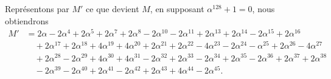 \documentclass[12pt,a4paper]{article}
\theoremstyle{definition}
\begin{document}
Repr\'{e}sentons par $M'$ ce que devient $M$, en supposant $\alpha^{128} + 1 = 0$, nous obtiendrons
\begin{align*}
M' &= 2\alpha - 2\alpha^4 + 2\alpha^5 + 2\alpha^7 + 2\alpha^8 - 2\alpha^{10} - 2\alpha^{11} + 2\alpha^{13} + 2\alpha^{14} - 2\alpha^{15} + 2\alpha^{16} \\
&\quad + 2\alpha^{17} + 2\alpha^{18} + 4\alpha^{19} + 4\alpha^{20} + 2\alpha^{21} + 2\alpha^{22} - 4\alpha^{23} - 2\alpha^{24} - \alpha^{25} + 2\alpha^{26} - 4\alpha^{27} \\
&\quad + 2\alpha^{28} - 2\alpha^{29} + 4\alpha^{30} + 4\alpha^{31} - 2\alpha^{32} + 2\alpha^{33} - 2\alpha^{34} + 2\alpha^{35} - 2\alpha^{36} + 2\alpha^{37} + 2\alpha^{38} \\
&\quad - 2\alpha^{39} - 2\alpha^{40} + 2\alpha^{41} - 2\alpha^{42} + 2\alpha^{43} + 4\alpha^{44} - 2\alpha^{45}.
\end{align*}
\end{document}
